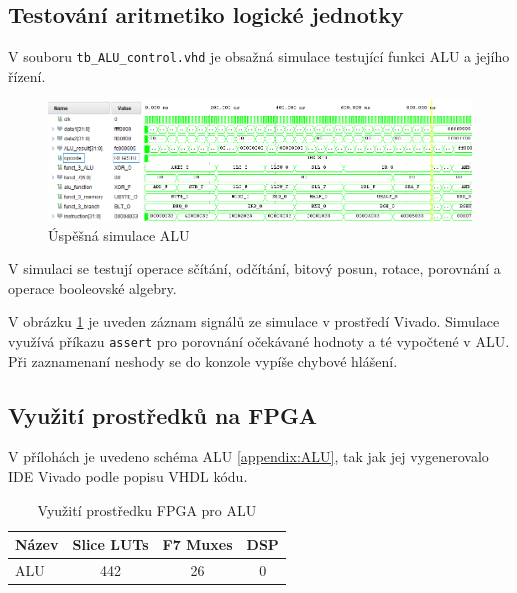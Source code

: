 \documentclass[FM,BP]{tulthesis}
\begin{document}
\subsection{Testování aritmetiko logické jednotky}
V souboru \verb|tb_ALU_control.vhd| je obsažná simulace testující funkci ALU a jejího řízení.

\begin{figure}[h]
    \centering
    \includegraphics[width=\textwidth]{assets/ALU_simulation.png}
    \caption{Úspěšná simulace ALU}
    \label{img:ALU_simulace}
\end{figure}


V simulaci se testují operace sčítání, odčítání, bitový posun, rotace, porovnání a  operace booleovské algebry.

V obrázku \ref{img:ALU_simulace} je uveden záznam signálů ze simulace v prostředí Vivado. 
Simulace využívá příkazu \verb|assert| pro porovnání očekávané hodnoty a té vypočtené v ALU. Při zaznamenaní neshody se do konzole vypíše chybové hlášení. 

\newpage

\subsection{Využití prostředků na FPGA}
V přílohách je uvedeno schéma ALU \ref{appendix:ALU}, tak jak jej vygenerovalo IDE Vivado podle popisu VHDL kódu. 

\begin{table}[h]
    \caption{Využití prostředku FPGA pro ALU}
    \label{table:ALU_resources}
    \begin{center}
        \begin{tabular}{|l|c|c|c|}
        \hline
        \textbf{Název} & \textbf{Slice LUTs} & \textbf{F7 Muxes} & \textbf{DSP} \\
        \hline
        ALU & 442 & 26 & 0 \\
        \hline
        \end{tabular}
    \end{center}
\end{table}
\end{document}
